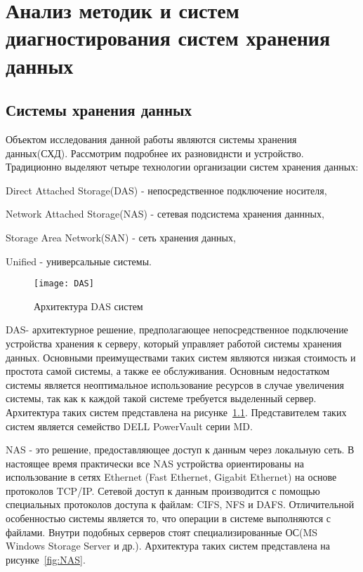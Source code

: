 \chapter{Анализ методик и систем диагностирования систем хранения данных}
\section{Системы хранения данных}
Объектом исследования данной работы являются системы хранения данных(СХД). Рассмотрим подробнее их разновиднсти и устройство. 
Традиционно выделяют четыре технологии организации систем хранения данных: 
\begin{itemize*}
	\item{Direct Attached Storage(DAS) - непосредственное подключение носителя,}
	\item{Network Attached Storage(NAS) - сетевая подсистема хранения даннных,}
	\item{Storage Area Network(SAN) - сеть хранения данных,}
	\item{Unified - универсальные системы.}
\end{itemize*}

\begin{figure}[!h]
	\centering
	\texttt{[image: DAS]}
	\caption{Архитектура DAS систем}
	\label{fig:DAS}
\end{figure}

DAS- архитектурное решение, предполагающее непосредственное подключение устройства хранения к серверу, который управляет работой системы хранения данных. Основными преимуществами таких систем являются низкая стоимость и простота самой системы, а также ее обслуживания. Основным недостатком системы является неоптимальное использование ресурсов в случае увеличения системы, так как к каждой такой системе требуется выделенный сервер. Архитектура таких систем представлена на рисунке~\ref{fig:DAS}. Представителем таких систем является семейство DELL PowerVault серии MD.

NAS - это решение, предоставляющее доступ к данным через локальную сеть. В настоящее время практически все NAS устройства ориентированы на использование в сетях Ethernet (Fast Ethernet, Gigabit Ethernet) на основе протоколов TCP/IP. Сетевой доступ к данным производится с помощью специальных протоколов доступа к файлам: CIFS, NFS и DAFS. Отличительной особенностью системы является то, что операции в системе выполняются с файлами. Внутри подобных серверов стоят специализированные ОС(MS Windows Storage Server и др.). Архитектура таких систем представлена на рисунке~\ref{fig:NAS}.

